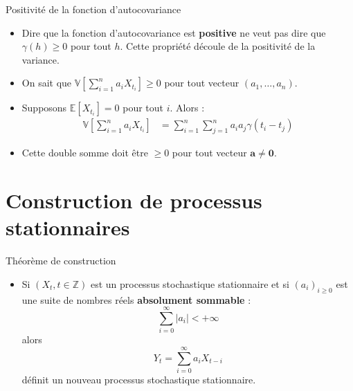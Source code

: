 \documentclass[11pt,aspectratio=169]{beamer}
\newcommand{\E}{\mathbb{E}}
\newcommand{\Var}{\mathbb{V}}
\newcommand{\Z}{\mathbb{Z}}
\begin{document}
\begin{frame}{Positivité de la fonction d'autocovariance}

\begin{itemize}

\item Dire que la fonction d'autocovariance est \textbf{positive} ne veut pas dire que $\gamma(h) \geq 0$ pour tout $h$. Cette propriété découle de la positivité de la variance.\newline

\item On sait que $\Var\left[\sum_{i=1}^n a_i X_{t_i}\right] \geq 0$ pour tout vecteur $(a_1, \ldots, a_n)$.\newline

\item Supposons $\E[X_{t_i}] = 0$ pour tout $i$. Alors :
  \begin{align*}
  \Var\left[\sum_{i=1}^n a_i X_{t_i}\right] &= \sum_{i=1}^n \sum_{j=1}^n a_i a_j \gamma(t_i - t_j)
  \end{align*}\newline

\item Cette double somme doit être $\geq 0$ pour tout vecteur $\mathbf{a} \neq \mathbf{0}$.

\end{itemize}

\end{frame}

\section{Construction de processus stationnaires}

\begin{frame}{Théorème de construction}

\begin{itemize}

\item Si $(X_t, t \in \Z)$ est un processus stochastique stationnaire et si $(a_i)_{i \geq 0}$ est une suite de nombres réels \textbf{absolument sommable} :
  \[
  \sum_{i=0}^{\infty} |a_i| < +\infty
  \]
  alors
  \[
  Y_t = \sum_{i=0}^{\infty} a_i X_{t-i}
  \]
  définit un nouveau processus stochastique stationnaire.

\end{itemize}

\end{frame}
\end{document}

